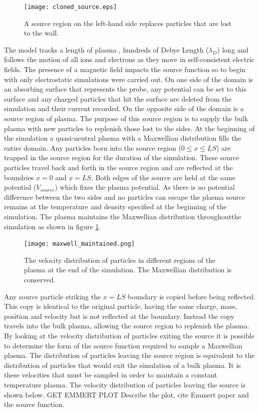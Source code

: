 \begin{figure}[H]
\centering
\texttt{[image: cloned\_source.eps]}
\caption{A source region on the left-hand side replaces particles that are lost to the wall.}
\end{figure}
The model tracks a length of plasma , hundreds of Debye Length ($\lambda_D$) long and follows the motion of all ions and electrons as they move in self-consistent electric fields. The presence of a magnetic field  impacts the source function so to begin with only electrostatic simulations were carried out. On one side of the domain is an absorbing surface that represents the probe, any potential can be set to this surface and any charged particles that hit the surface are deleted from the simulation and their current recorded. On the opposite side of the domain is a source region of plasma. The purpose of this source region is to supply the bulk plasma with new particles to replenish those lost to the sides. At the beginning of the simulation a quasi-neutral plasma with a Maxwellian distribution fills the entire domain. Any particles born into the source region ($0\leq x \leq LS$) are trapped in the source region for the duration of the simulation. These source particles travel back and forth in the source region and are reflected at the boundries $x=0$ and $x=LS$. Both edges of the source are held at the same potential ($V_{source}$) which fixes the plasma potential. As there is no potential difference between the two sides and no particles can escape the plasma source remains at the temperature and density specified at the beginning of the simulation. The plasma maintains the Maxwellian distribution throughoutthe simulation as shown in figure \ref{fig:maxwell_maintained}.
\begin{figure}[H]
\centering
\texttt{[image: maxwell\_maintained.png]}
\caption{The velocity distribution of particles in different regions of the plasma at the end of the simulation. The Maxwellian distribution is conserved.}
\label{fig:maxwell_maintained}
\end{figure}
Any source particle striking the $x=LS$ boundary is copied before being reflected. This copy is identical to the original particle, having the same charge, mass, position and velocity but is not reflected at the boundary. Instead the copy travels into the bulk plasma, allowing the source region to replenish the plasma. By looking at the velocity distribution of particles exiting the source it is possible to determine the form of the source function required to sample a Maxwellian plasma. The distribution of particles leaving the source region is equivalent to the distribution of particles that would exit the simulation of a bulk plasma. It is these velocities that must be sampled in order to maintain a constant temperature plasma. The velocity distribution of particles leaving the source is shown below.
GET EMMERT PLOT
Describe the plot, cite Emmert paper and the source function.

